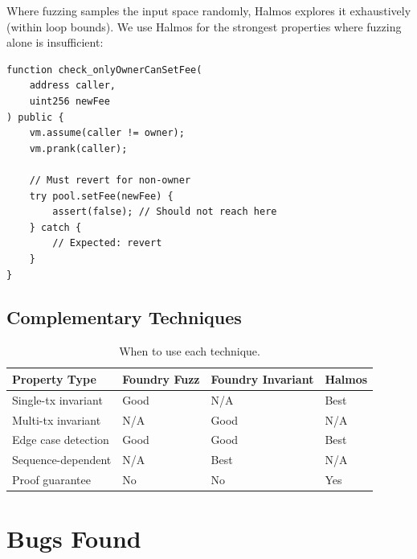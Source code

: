 \documentclass[11pt,a4paper]{article}
\begin{document}
Where fuzzing samples the input space randomly, Halmos explores it exhaustively (within
loop bounds). We use Halmos for the strongest properties where fuzzing alone is
insufficient:

\begin{lstlisting}[language=Solidity,caption={Halmos symbolic test for access control}]
function check_onlyOwnerCanSetFee(
    address caller,
    uint256 newFee
) public {
    vm.assume(caller != owner);
    vm.prank(caller);

    // Must revert for non-owner
    try pool.setFee(newFee) {
        assert(false); // Should not reach here
    } catch {
        // Expected: revert
    }
}
\end{lstlisting}

\subsection{Complementary Techniques}

\begin{table}[H]
\centering
\small
\begin{tabular}{@{}llll@{}}
\toprule
\textbf{Property Type} & \textbf{Foundry Fuzz} & \textbf{Foundry Invariant} & \textbf{Halmos} \\
\midrule
Single-tx invariant & Good & N/A & Best \\
Multi-tx invariant & N/A & Good & N/A \\
Edge case detection & Good & Good & Best \\
Sequence-dependent & N/A & Best & N/A \\
Proof guarantee & No & No & Yes \\
\bottomrule
\end{tabular}
\caption{When to use each technique.}
\end{table}

\section{Bugs Found}
\end{document}
